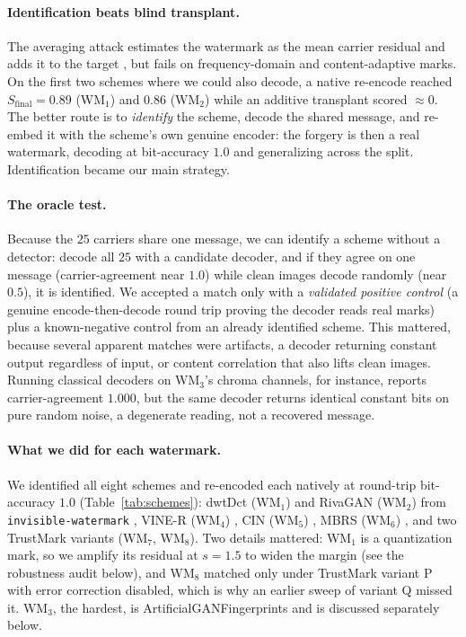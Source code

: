 \documentclass{article} %
\begin{document}
\paragraph{Identification beats blind transplant.}
The averaging attack estimates the watermark as the mean carrier residual and adds it to the target
\citep{craver1998}, but fails on frequency-domain and content-adaptive marks. On the first two schemes where
we could also decode, a native re-encode reached $S_\text{final}=0.89$ (WM$_1$) and $0.86$ (WM$_2$) while an
additive transplant scored $\approx0$. The better route is to \emph{identify} the scheme, decode the shared
message, and re-embed it with the scheme's own genuine encoder: the forgery is then a real watermark, decoding
at bit-accuracy $1.0$ and generalizing across the split. Identification became our main strategy.

\paragraph{The oracle test.}
Because the $25$ carriers share one message, we can identify a scheme without a detector: decode all $25$ with
a candidate decoder, and if they agree on one message (carrier-agreement near $1.0$) while clean images decode
randomly (near $0.5$), it is identified. We accepted a match only with a \emph{validated positive control}
(a genuine encode-then-decode round trip proving the decoder reads real marks) plus a known-negative control
from an already identified scheme. This mattered, because several apparent matches were artifacts, a decoder
returning constant output regardless of input, or content correlation that also lifts clean images. Running
classical decoders on WM$_3$'s chroma channels, for instance, reports carrier-agreement $1.000$, but the same
decoder returns identical constant bits on pure random noise, a degenerate reading, not a recovered message.

\paragraph{What we did for each watermark.}
We identified all eight schemes and re-encoded each natively at round-trip bit-accuracy $1.0$
(Table~\ref{tab:schemes}): dwtDct (WM$_1$) and RivaGAN (WM$_2$) from \texttt{invisible-watermark}
\citep{zhang2019riva}, VINE-R (WM$_4$) \citep{lu2025vine}, CIN (WM$_5$) \citep{ma2022cin}, MBRS (WM$_6$)
\citep{jia2021mbrs}, and two TrustMark variants \citep{bui2023trustmark} (WM$_7$, WM$_8$). Two details
mattered: WM$_1$ is a quantization mark, so we amplify its residual at $s=1.5$ to widen the margin (see the
robustness audit below), and WM$_8$ matched only under TrustMark variant P with error correction disabled,
which is why an earlier sweep of variant Q missed it. WM$_3$, the hardest, is ArtificialGANFingerprints
\citep{yu2021artificial} and is discussed separately below.
\end{document}
